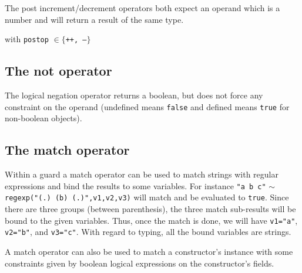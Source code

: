 \documentclass[11pt]{report}
\begin{document}
The post increment/decrement operators both expect an operand which is a number and will return a result of the same type.

\begin{center}
\DP
\end{center}
\begin{center}with  \texttt{postop} $\in \{$\texttt{++, --}$\}$\end{center}

\subsection{The not operator}

The logical negation operator returns a boolean, but does not force any constraint on the operand (undefined means \texttt{false} and defined means \texttt{true} for non-boolean objects).

\begin{center}
\DP
\end{center}

\subsection{The match operator}

Within a guard a match operator can be used to match strings with regular expressions and bind the results to some variables. For instance \texttt{"a b c"} $\sim$ \texttt{regexp("(.) (b) (.)",v1,v2,v3)} will match and be evaluated to \texttt{true}. Since there are three groups (between parenthesis), the three match sub-results will be bound to the given variables. Thus, once the match is done, we will have \texttt{v1="a"}, \texttt{v2="b"}, and \texttt{v3="c"}. With regard to typing, all the bound variables are strings.

\begin{center}
  
\DP
\end{center}

A match operator can also be used to match a constructor's instance with some constraints given by boolean logical expressions on the constructor's fields.
\end{document}
